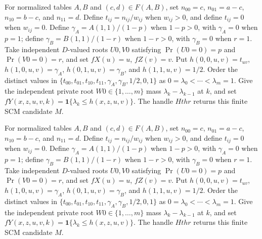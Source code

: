 For normalized tables \(A,B\) and \((c,d)\in F(A,B)\), set \(n_{00}=c\), \(n_{01}=a-c\), \(n_{10}=b-c\), and \(n_{11}=d\).  Define \(t_{ij}=n_{ij}/w_{ij}\) when \(w_{ij}>0\), and define \(t_{ij}=0\) when \(w_{ij}=0\).  Define \(\gamma_A=A(1,1)/(1-p)\) when \(1-p>0\), with \(\gamma_A=0\) when \(p=1\); define \(\gamma_B=B(1,1)/(1-r)\) when \(1-r>0\), with \(\gamma_B=0\) when \(r=1\).  Take independent \(D\)-valued roots \(U0,V0\) satisfying \(\Pr(U0=0)=p\) and \(\Pr(V0=0)=r\), and set \(fX(u)=u\), \(fZ(v)=v\).  Put \(h(0,0,u,v)=t_{uv}\), \(h(1,0,u,v)=\gamma_A\), \(h(0,1,u,v)=\gamma_B\), and \(h(1,1,u,v)=1/2\).  Order the distinct values in \(\{t_{00},t_{01},t_{10},t_{11},\gamma_A,\gamma_B,1/2,0,1\}\) as \(0=\lambda_0<\cdots<\lambda_m=1\).  Give the independent private root \(W0\in\{1,\ldots,m\}\) mass \(\lambda_k-\lambda_{k-1}\) at \(k\), and set \(fY(x,z,u,v,k)=\mathbf 1\{\lambda_k\le h(x,z,u,v)\}\).  The handle \(Hthr\) returns this finite SCM candidate \(M\).

For normalized tables \(A,B\) and \((c,d)\in F(A,B)\), set \(n_{00}=c\), \(n_{01}=a-c\), \(n_{10}=b-c\), and \(n_{11}=d\).  Define \(t_{ij}=n_{ij}/w_{ij}\) when \(w_{ij}>0\), and define \(t_{ij}=0\) when \(w_{ij}=0\).  Define \(\gamma_A=A(1,1)/(1-p)\) when \(1-p>0\), with \(\gamma_A=0\) when \(p=1\); define \(\gamma_B=B(1,1)/(1-r)\) when \(1-r>0\), with \(\gamma_B=0\) when \(r=1\).  Take independent \(D\)-valued roots \(U0,V0\) satisfying \(\Pr(U0=0)=p\) and \(\Pr(V0=0)=r\), and set \(fX(u)=u\), \(fZ(v)=v\).  Put \(h(0,0,u,v)=t_{uv}\), \(h(1,0,u,v)=\gamma_A\), \(h(0,1,u,v)=\gamma_B\), and \(h(1,1,u,v)=1/2\).  Order the distinct values in \(\{t_{00},t_{01},t_{10},t_{11},\gamma_A,\gamma_B,1/2,0,1\}\) as \(0=\lambda_0<\cdots<\lambda_m=1\).  Give the independent private root \(W0\in\{1,\ldots,m\}\) mass \(\lambda_k-\lambda_{k-1}\) at \(k\), and set \(fY(x,z,u,v,k)=\mathbf 1\{\lambda_k\le h(x,z,u,v)\}\).  The handle \(Hthr\) returns this finite SCM candidate \(M\).

